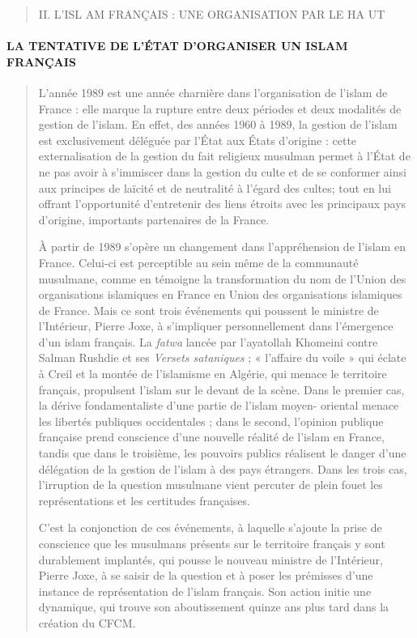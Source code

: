 \begin{quote}
II. L'ISL AM FRANÇAIS : UNE ORGANISATION PAR LE HA UT
\end{quote}

\hypertarget{la-tentative-de-luxe9tat-dorganiser-un-islam-franuxe7ais}{%
\paragraph{LA TENTATIVE DE L'ÉTAT D'ORGANISER UN ISLAM
FRANÇAIS}\label{la-tentative-de-luxe9tat-dorganiser-un-islam-franuxe7ais}}

\begin{quote}
L'année 1989 est une année charnière dans l'organisation de l'islam de
France : elle marque la rupture entre deux périodes et deux modalités de
gestion de l'islam. En effet, des années 1960 à 1989, la gestion de
l'islam est exclusivement déléguée par l'État aux États d'origine :
cette externalisation de la gestion du fait religieux musulman permet à
l'État de ne pas avoir à s'immiscer dans la gestion du culte et de se
conformer ainsi aux principes de laïcité et de neutralité à l'égard des
cultes; tout en lui offrant l'opportunité d'entretenir des liens étroits
avec les principaux pays d'origine, importants partenaires de la France.

À partir de 1989 s'opère un changement dans l'appréhension de l'islam en
France. Celui-ci est perceptible au sein même de la communauté
musulmane, comme en témoigne la transformation du nom de l'Union des
organisations islamiques en France en Union des organisations islamiques
de France. Mais ce sont trois événements qui poussent le ministre de
l'Intérieur, Pierre Joxe, à s'impliquer personnellement dans l'émergence
d'un islam français. La \emph{fatwa} lancée par l'ayatollah Khomeini
contre Salman Rushdie et ses \emph{Versets sataniques} ; « l'affaire du
voile » qui éclate à Creil et la montée de l'islamisme en Algérie, qui
menace le territoire français, propulsent l'islam sur le devant de la
scène. Dans le premier cas, la dérive fondamentaliste d'une partie de
l'islam moyen- oriental menace les libertés publiques occidentales ;
dans le second, l'opinion publique française prend conscience d'une
nouvelle réalité de l'islam en France, tandis que dans le troisième, les
pouvoirs publics réalisent le danger d'une délégation de la gestion de
l'islam à des pays étrangers. Dans les trois cas, l'irruption de la
question musulmane vient percuter de plein fouet les représentations et
les certitudes françaises.



C'est la conjonction de ces événements, à laquelle s'ajoute la prise de
conscience que les musulmans présents sur le territoire français y sont
durablement implantés, qui pousse le nouveau ministre de l'Intérieur,
Pierre Joxe, à se saisir de la question et à poser les prémisses d'une
instance de représentation de l'islam français. Son action initie une
dynamique, qui trouve son aboutissement quinze ans plus tard dans la
création du CFCM.
\end{quote}

